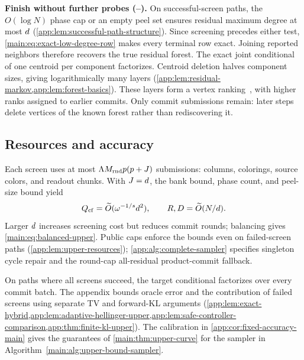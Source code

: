 {\textbf{Finish without further probes (--).}
On successful-screen paths, the $O(\log N)$ phase cap or an empty peel set
ensures residual maximum degree at most $d$
(\cref{app:lem:successful-path-structure}).
Since screening precedes either test,
\cref{main:eq:exact-low-degree-row} makes every terminal row exact.
Joining reported neighbors therefore recovers the true residual forest.
The exact joint conditional of one centroid per component factorizes.
Centroid deletion halves component sizes, giving logarithmically many layers
(\cref{app:lem:residual-markov,app:lem:forest-basics}).
These layers form a vertex ranking~\citep{iyer1988optimal}, with higher ranks
assigned to earlier commits.
Only commit submissions remain: later steps delete vertices of the known
forest rather than rediscovering it.

\subsection{Resources and accuracy}
\label{sec:main-algorithm-resources}

Each screen uses at most
$\Lambda M_{\mathrm{rnd}} p(p+J)$ submissions:
columns, colorings, source colors, and readout chunks.
With $J=d$, the bank bound, phase count, and peel-size
bound yield
\[
 Q_{\mathrm{cf}}
 =\widetilde O(\omega^{-1/s}d^2),
 \qquad
 R,D=\widetilde O(N/d).
\]
Larger $d$ increases screening cost but reduces commit rounds;
balancing gives
\cref{main:eq:balanced-upper}.
Public caps enforce the bounds even on failed-screen paths
(\cref{app:lem:upper-resources}); \cref{app:alg:complete-sampler} specifies
singleton cycle repair and the round-cap all-residual product-commit fallback.

On paths where all screens succeed, the target conditional factorizes over
every commit batch.
The appendix bounds oracle error and the contribution of failed screens
using separate TV and forward-KL arguments
(\cref{app:lem:exact-hybrid,app:lem:adaptive-hellinger-upper,app:lem:safe-controller-comparison,app:thm:finite-kl-upper}).
The calibration in \cref{app:cor:fixed-accuracy-main} gives the guarantees
of \cref{main:thm:upper-curve} for the sampler in
Algorithm~\ref{main:alg:upper-bound-sampler}.
}
